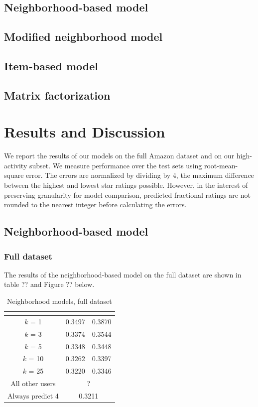\documentclass[letterpaper, 10 pt, conference]{ieeeconf}
\begin{document}
\subsection{Neighborhood-based model}
\subsection{Modified neighborhood model}
\subsection{Item-based model}
\subsection{Matrix factorization}

\section{Results and Discussion}
\label{sec:results}

We report the results of our models on the full Amazon dataset and on our 
high-activity subset. We measure performance over the test sets using 
root-mean-square error. The errors are normalized by dividing by 4, the maximum 
difference between the highest and lowest star ratings possible. However, 
in the interest of preserving granularity for model comparison, predicted
fractional ratings are not rounded to the nearest integer before calculating 
the errors. 

\subsection{Neighborhood-based model}
\subsubsection{Full dataset}
The results of the neighborhood-based model on the full dataset are shown in 
table ?? and Figure ?? below.


\begin{table}[htb]
\centering
\begin{tabular}{|c|c|c|}
\cline{2-3}

\multicolumn{1}{c|}{} & \vbox{\hbox{\strut Neighborhood model}} 
& \vbox{\hbox{\strut Modified }\hbox{\strut neighborhood model}} \tabularnewline \hline
$k$ = 1 & 0.3497 & 0.3870 \tabularnewline
$k$ = 3 &  0.3374 & 0.3544 \tabularnewline
$k$ = 5 & 0.3348 & 0.3448 \tabularnewline
$k$ = 10 & 0.3262 & 0.3397 \tabularnewline
$k$ = 25  & 0.3220 & 0.3346 \tabularnewline
\hline
All other users & \multicolumn{2}{|c|}{?}  \tabularnewline
\hline
Always predict 4 & \multicolumn{2}{|c|}{0.3211}  \tabularnewline
\hline
\end{tabular}
\caption{Neighborhood models, full dataset}
\end{table}
\end{document}
